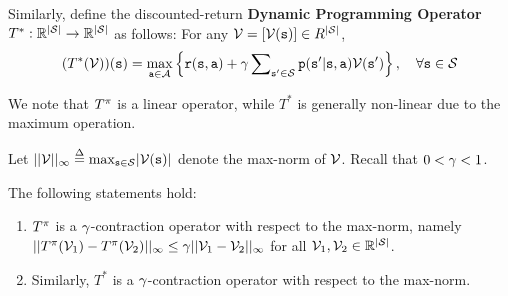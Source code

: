 Similarly, define the discounted-return \textbf{Dynamic Programming
Operator}  $T^*:\mathbb R^{|\mathcal{S}|} \to \mathbb R^{|\mathcal{S}|}$ as
follows: For any $\mathcal{V}=\left[\mathcal{V}({\tt s})\right]\in R^{|\mathcal{S}|}$,
\[(T_{}^*(\mathcal{V}))({\tt s}) = \mathop {\max }\limits_{{\tt a} \in \mathcal{A}} \left\{ {{\tt r}({\tt s},{\tt a}) + \gamma \sum\nolimits_{{\tt s}' \in \mathcal{S}} {{\tt p}({\tt s}'|{\tt s},{\tt a})\mathcal{V}({\tt s}')} } \right\},\quad \forall {\tt s} \in \mathcal{S}\]

We note that $T_{}^\pi $ is a linear operator, while $T_{}^*$ is
generally non-linear due to the maximum operation.

Let $||\Value|{|_\infty } \buildrel \Delta \over = {\max _{\state \in
\States}}|\Value(\state)|$ denote the max-norm of $\mathcal{V}$.  Recall that $0 <
\gamma < 1$.

\begin{theorem}
\label{thm:DP_op}
%
The following statements hold:
\begin{enumerate}
  \item $T_{}^\pi $ is a $\gamma$-contraction operator with respect to the max-norm,  namely
                      $||T_{}^\pi ({\mathcal{V}_1}) - T_{}^\pi ({\mathcal{V}_2})|{|_\infty } \le \gamma ||{\mathcal{V}_1} - {\mathcal{V}_2}|{|_\infty }$ for all $\mathcal{V}_1,\mathcal{V}_2\in \mathbb{R}^{|\mathcal{S}|}$.
  \item Similarly, $T_{}^*$ is a $\gamma$-contraction operator with respect to the max-norm.
\end{enumerate}
\end{theorem}

